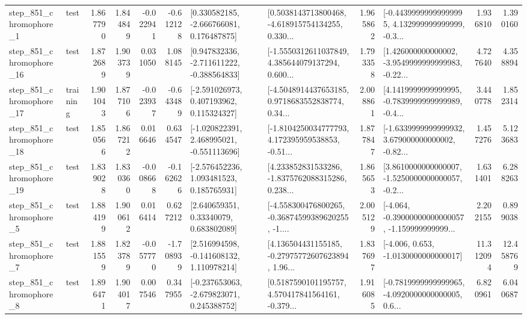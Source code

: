 \begin{tabular}{llrrrrllrlrr}
   step\_851\_chromophore\_1 &      test &      1.867790 &    1.844849 &     -0.022941 & -0.612128 &    [0.330582185, -2.666766081, 0.176487875] &  [0.5038143713800468, -4.618915754134255, 0.330... &       1.965862 &  [-0.44399999999999995, 4.132999999999999, -0.3... &            1.936810 &          1.390160 \\
  step\_851\_chromophore\_16 &      test &      1.872689 &    1.903739 &      0.031050 &  1.088145 &   [0.947832336, -2.711611222, -0.388564833] &  [-1.5550312611037849, 4.385644079137294, 0.600... &       1.793358 &  [1.426000000000002, -3.9549999999999983, -0.22... &            4.727640 &          4.358894 \\
  step\_851\_chromophore\_17 &  training &      1.901043 &    1.877106 &     -0.023937 & -0.643489 &    [-2.591026973, 0.407193962, 0.115324327] &  [-4.5048914437653185, 0.9718683552838774, 0.34... &       2.008861 &  [4.1419999999999995, -0.7839999999999989, -0.4... &            3.440778 &          1.852314 \\
  step\_851\_chromophore\_18 &      test &      1.850566 &    1.867212 &      0.016646 &  0.634547 &   [-1.020822391, 2.468995021, -0.551113696] &  [-1.8104250034777793, 4.172395959538853, -0.51... &       1.877847 &  [-1.6339999999999932, 3.679000000000002, -0.82... &            1.457276 &          5.123683 \\
  step\_851\_chromophore\_19 &      test &      1.839028 &    1.830360 &     -0.008668 & -0.162626 &    [-2.576452236, 1.093481523, 0.185765931] &  [4.233852831533286, -1.8375762088315286, 0.238... &       1.865653 &  [3.8610000000000007, -1.5250000000000057, -0.2... &            1.631401 &          6.288263 \\
   step\_851\_chromophore\_5 &      test &      1.884199 &    1.900612 &      0.016414 &  0.627212 &      [2.640659351, 0.33340079, 0.683802089] &  [-4.558300476800265, -0.36874599389620255, -1.... &       2.005129 &  [-4.064, -0.39000000000000057, -1.159999999999... &            2.202155 &          0.899038 \\
   step\_851\_chromophore\_7 &      test &      1.881559 &    1.823789 &     -0.057770 & -1.708939 &    [2.516994598, -0.141608132, 1.110978214] &  [4.136504431155185, -0.27975772607623894, 1.96... &       1.837697 &               [-4.006, 0.653, -1.0130000000000017] &           11.312094 &         12.458769 \\
   step\_851\_chromophore\_8 &      test &      1.896471 &    1.904017 &      0.007546 &  0.347955 &   [-0.237653063, -2.679823071, 0.245388752] &  [0.5187590101195757, 4.570417841564161, -0.379... &       1.916085 &  [-0.7819999999999965, -4.0920000000000005, 0.6... &            6.820961 &          6.040687 \\

\end{tabular}
